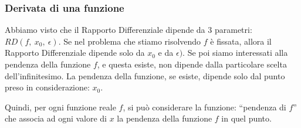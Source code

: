 % 

\subsubsection{Derivata di una funzione}
\label{subsec:differenziazione_derivatafunzione}
Abbiamo visto che il Rapporto Differenziale dipende da \(3\) parametri:
\(RD(f,~x_0,~\epsilon)\). 
Se nel problema che stiamo risolvendo \(f\) è fissata, allora il Rapporto 
Differenziale dipende solo da \(x_0\) e da \(\epsilon)\). 
Se poi siamo interessati alla pendenza della funzione \(f\), 
e questa esiste, non dipende dalla particolare scelta dell'infinitesimo. 
La pendenza della funzione, se esiste, dipende solo dal punto preso 
in considerazione: \(x_0\).

Quindi, per ogni funzione reale \(f\), si può considerare la funzione: 
``pendenza di \(f\)'' che associa ad ogni valore di \(x\) la pendenza 
della funzione \(f\) in quel punto. 


